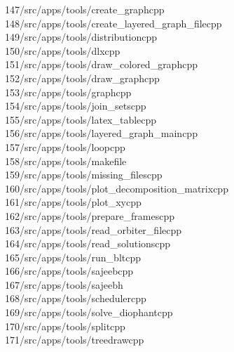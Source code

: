 \begin{tabbing}
147\>/src/apps/tools/create\_graphcpp\\[0pt]
148\>/src/apps/tools/create\_layered\_graph\_filecpp\\[0pt]
149\>/src/apps/tools/distributioncpp\\[0pt]
150\>/src/apps/tools/dlxcpp\\[0pt]
151\>/src/apps/tools/draw\_colored\_graphcpp\\[0pt]
152\>/src/apps/tools/draw\_graphcpp\\[0pt]
153\>/src/apps/tools/graphcpp\\[0pt]
154\>/src/apps/tools/join\_setscpp\\[0pt]
155\>/src/apps/tools/latex\_tablecpp\\[0pt]
156\>/src/apps/tools/layered\_graph\_maincpp\\[0pt]
157\>/src/apps/tools/loopcpp\\[0pt]
158\>/src/apps/tools/makefile\\[0pt]
159\>/src/apps/tools/missing\_filescpp\\[0pt]
160\>/src/apps/tools/plot\_decomposition\_matrixcpp\\[0pt]
161\>/src/apps/tools/plot\_xycpp\\[0pt]
162\>/src/apps/tools/prepare\_framescpp\\[0pt]
163\>/src/apps/tools/read\_orbiter\_filecpp\\[0pt]
164\>/src/apps/tools/read\_solutionscpp\\[0pt]
165\>/src/apps/tools/run\_bltcpp\\[0pt]
166\>/src/apps/tools/sajeebcpp\\[0pt]
167\>/src/apps/tools/sajeebh\\[0pt]
168\>/src/apps/tools/schedulercpp\\[0pt]
169\>/src/apps/tools/solve\_diophantcpp\\[0pt]
170\>/src/apps/tools/splitcpp\\[0pt]
171\>/src/apps/tools/treedrawcpp\\[0pt]

\end{tabbing}
